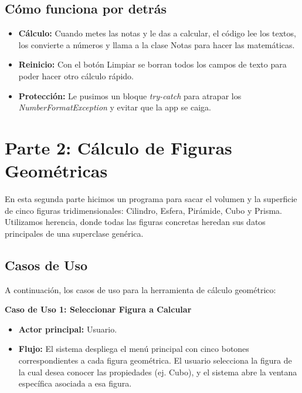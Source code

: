 \documentclass[a4paper,11pt]{article}
\begin{document}
\begin{figure}[H]
\begin{center}
{
}
\end{center}
\end{figure}

\subsection{Cómo funciona por detrás}
\begin{itemize}
    \item \textbf{Cálculo:} Cuando metes las notas y le das a calcular, el código lee los textos, los convierte a números y llama a la clase Notas para hacer las matemáticas.
    \item \textbf{Reinicio:} Con el botón Limpiar se borran todos los campos de texto para poder hacer otro cálculo rápido.
    \item \textbf{Protección:} Le pusimos un bloque \textit{try-catch} para atrapar los \textit{NumberFormatException} y evitar que la app se caiga.
\end{itemize}


\section{Parte 2: Cálculo de Figuras Geométricas}
En esta segunda parte hicimos un programa para sacar el volumen y la superficie de cinco figuras tridimensionales: Cilindro, Esfera, Pirámide, Cubo y Prisma. Utilizamos herencia, donde todas las figuras concretas heredan sus datos principales de una superclase genérica.

\subsection{Casos de Uso}
A continuación, los casos de uso para la herramienta de cálculo geométrico:

\textbf{Caso de Uso 1: Seleccionar Figura a Calcular}
\begin{itemize}
    \item \textbf{Actor principal:} Usuario.
    \item \textbf{Flujo:} El sistema despliega el menú principal con cinco botones correspondientes a cada figura geométrica. El usuario selecciona la figura de la cual desea conocer las propiedades (ej. Cubo), y el sistema abre la ventana específica asociada a esa figura.
\end{itemize}
\end{document}
